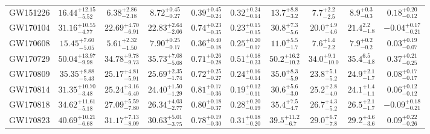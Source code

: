 \begin{table}[t]
\begin{ruledtabular}
\begin{tabular}{cccccccccc}
\vspace{1.0 mm}
GW151226 & $16.44_{-5.52}^{+12.15}$& $6.38_{-2.18}^{+2.86}$& $8.72_{-0.27}^{+0.45}$& $0.39_{-0.24}^{+0.45}$& $0.32_{-0.14}^{+0.24}$&   $13.7_{-3.2}^{+8.8}$            & $7.7_{-2.5}^{+2.2}$               &  $8.9_{-0.3}^{+0.3}$                     & $0.18_{-0.12}^{+0.20}$              \\
\vspace{1.0 mm}
GW170104 & $31.16_{-4.77}^{+10.55}$& $22.69_{-6.91}^{+4.70}$& $22.83_{-2.06}^{+2.64}$& $0.74_{-0.35}^{+0.23}$& $0.23_{-0.15}^{+0.15}$&  $30.8_{-5.6}^{+7.3}$             & $20.0_{-4.6}^{+4.9}$              & $21.4_{-1.8}^{2.2}$                       &  $-0.04_{-0.21}^{+0.17}$             \\
\vspace{1.0 mm}
GW170608 & $15.45_{-5.05}^{+7.60}$& $5.61_{-1.50}^{+2.32}$& $7.90_{-0.17}^{+0.25}$& $0.36_{-0.18}^{+0.40}$& $0.25_{-0.17}^{+0.20}$&  $11.0_{-1.7}^{+5.5}$             & $7.6_{-2.2}^{+1.4}$              &      $7.9_{-0.2}^{+0.2}$                  &    $0.03_{-0.07}^{+0.19}$           \\
\vspace{1.0 mm}
GW170729 & $50.04_{-9.98}^{+13.97}$& $34.78_{-9.73}^{+9.78}$& $35.73_{-5.08}^{+7.08}$& $0.71_{-0.28}^{+0.26}$& $0.51_{-0.23}^{+0.18}$&  $50.2_{-10.2}^{+16.2}$             &  $34.0_{-10.0}^{+9.1}$             & $35.4_{-4.8}^{6.5}$                      &  $0.37_{-0.25}^{+0.21}$              \\
\vspace{1.0 mm}
GW170809 & $35.35_{-5.43}^{+8.88}$& $25.17_{-5.91}^{+4.81}$& $25.69_{-1.74}^{+2.35}$& $0.72_{-0.27}^{+0.25}$& $0.24_{-0.14}^{+0.16}$&    $35.0_{-5.9}^{+8.3}$           &                 $23.8_{-5.2}^{+5.1}$                     &  $24.9_{-1.7}^{+2.1}$   & $0.08_{-0.17}^{+0.17}$             \\
\vspace{1.0 mm}
GW170814 & $31.35_{-3.48}^{+10.70}$& $25.24_{-6.40}^{+3.16}$& $24.40_{-1.29}^{+1.50}$& $0.81_{-0.36}^{+0.17}$& $0.19_{-0.11}^{+0.12}$&  $30.6_{-3.0}^{+5.6}$             &               $25.2_{-4.0}^{+2.8}$&   $24.1_{-1.1}^{+1.4}$                    &   $0.06_{-0.12}^{+0.12}$           \\
\vspace{1.0 mm}
GW170818 &$34.62_{-5.18}^{+11.61}$& $27.09_{-7.80}^{+5.59}$& $26.34_{-2.77}^{+4.03}$& $0.80_{-0.37}^{+0.18}$& $0.28_{-0.19}^{+0.20}$&   $35.4_{-4.7}^{+7.5}$            &               $26.7_{-5.2}^{+4.3}$& $26.5_{-1.7}^{+2.1}$                      &  $-0.09_{-0.21}^{+0.18}$            \\
\vspace{1.0 mm}
GW170823 & $40.69_{-6.68}^{+10.21}$& $31.17_{-8.09}^{+7.13}$& $30.63_{-3.75}^{+5.01}$& $0.78_{-0.30}^{+0.19}$& $0.31_{-0.20}^{+0.18}$&  $39.5_{-6.7}^{+11.2}$             &               $29.0_{-7.8}^{+6.7}$&   $29.2_{-3.6}^{+4.6}$                    &    $0.09_{-0.26}^{+0.22}$          \\
\end{tabular}
\end{ruledtabular}
\end{table}

